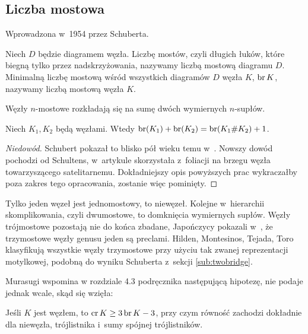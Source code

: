 
\subsection{Liczba mostowa}
%

Wprowadzona w~1954 przez Schuberta.

\begin{definition}
    Niech $D$ będzie diagramem węzła.
    Liczbę mostów, czyli długich łuków, które biegną tylko przez nadskrzyżowania, nazywamy liczbą mostową diagramu $D$.
    Minimalną liczbę mostową wśród wszystkich diagramów $D$ węzła $K$, $\operatorname{br} K$, nazywamy liczbą mostową węzła $K$.
\end{definition}

Węzły $n$-mostowe rozkładają się na sumę dwóch wymiernych $n$-supłów.
%

\begin{proposition}
\label{prp:bridge_additive}%
    Niech $K_1, K_2$ będą węzłami.
    Wtedy $\operatorname{br} (K_1) + \operatorname{br}(K_2) = \operatorname{br}(K_1 \# K_2) + 1$.
\end{proposition}

\begin{proof}[Niedowód]
    Schubert pokazał to blisko pół wieku temu w~\cite{schubert54}.
    Nowszy dowód pochodzi od Schultens, w~artykule \cite{schultens03} skorzystała z~foliacji na brzegu węzła towarzyszącego satelitarnemu.
    Dokładniejszy opis powyższych prac wykraczałby poza zakres tego opracowania, zostanie więc pominięty.
\end{proof}

Tylko jeden węzeł jest jednomostowy, to niewęzeł.
Kolejne w~hierarchii skomplikowania, czyli dwumostowe, to domknięcia wymiernych supłów.
Węzły trójmostowe pozostają nie do końca zbadane, Japończycy pokazali w~\cite{fukuhama99}, że trzymostowe węzły genusu jeden są preclami.
%
%
%
Hilden, Montesinos, Tejada, Toro \cite{hilden12} klasyfikują wszystkie węzły trzymostowe przy użyciu tak zwanej reprezentacji motylkowej, podobną do wyniku Schuberta z~sekcji \ref{sub:twobridge}.
%
%
%

Murasugi wspomina w rozdziale 4.3 podręcznika \cite{murasugi96} następującą hipotezę, nie podaje jednak wcale, skąd się wzięła:

\begin{conjecture}
%
    Jeśli $K$ jest węzłem, to $\operatorname{cr} K \ge 3 \operatorname{br} K - 3$, przy czym równość zachodzi dokładnie dla niewęzła, trójlistnika i~sumy spójnej trójlistników.
\end{conjecture}

